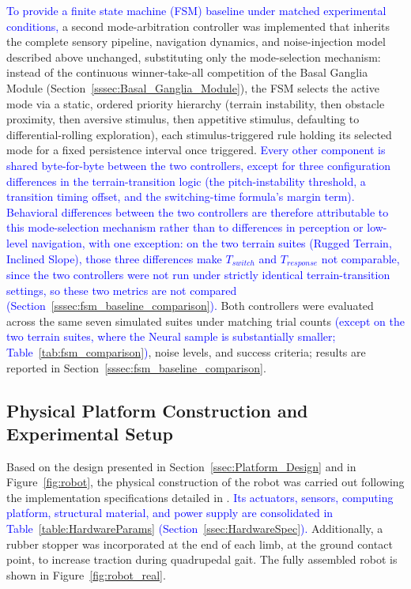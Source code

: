 \documentclass[preprint,12pt]{elsarticle}
\newcommand{\revblue}[1]{\textcolor{blue}{#1}}
\begin{document}
\revblue{To provide a finite state machine (FSM) baseline under matched experimental conditions,} a second mode-arbitration controller was implemented that inherits the complete sensory pipeline, navigation dynamics, and noise-injection model described above unchanged, substituting only the mode-selection mechanism: instead of the continuous winner-take-all competition of the Basal Ganglia Module (Section~\ref{sssec:Basal_Ganglia_Module}), the FSM selects the active mode via a static, ordered priority hierarchy (terrain instability, then obstacle proximity, then aversive stimulus, then appetitive stimulus, defaulting to differential-rolling exploration), each stimulus-triggered rule holding its selected mode for a fixed persistence interval once triggered. \revblue{Every other component is shared byte-for-byte between the two controllers, except for three configuration differences in the terrain-transition logic (the pitch-instability threshold, a transition timing offset, and the switching-time formula's margin term). Behavioral differences between the two controllers are therefore attributable to this mode-selection mechanism rather than to differences in perception or low-level navigation, with one exception: on the two terrain suites (Rugged Terrain, Inclined Slope), those three differences make $T_{switch}$ and $T_{response}$ not comparable, since the two controllers were not run under strictly identical terrain-transition settings, so these two metrics are not compared (Section~\ref{sssec:fsm_baseline_comparison}).} Both controllers were evaluated across the same seven simulated suites under matching trial counts \revblue{(except on the two terrain suites, where the Neural sample is substantially smaller; Table~\ref{tab:fsm_comparison})}, noise levels, and success criteria; results are reported in Section~\ref{sssec:fsm_baseline_comparison}.

\FloatBarrier

\subsection{Physical Platform Construction and Experimental Setup}
\label{ssec:Construction}

Based on the design presented in Section~\ref{ssec:Platform_Design} and in Figure~\ref{fig:robot}, the physical construction of the robot was carried out following the implementation specifications detailed in \citep{Grajales_Des_2025}. \revblue{Its actuators, sensors, computing platform, structural material, and power supply are consolidated in Table~\ref{table:HardwareParams} (Section~\ref{ssec:HardwareSpec}).} Additionally, a rubber stopper was incorporated at the end of each limb, at the ground contact point, to increase traction during quadrupedal gait. The fully assembled robot is shown in Figure~\ref{fig:robot_real}.
\end{document}
